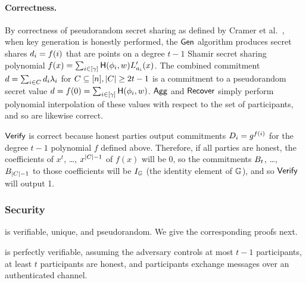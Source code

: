 \paragraph{Correctness.}
By correctness of pseudorandom secret sharing as defined by Cramer et al.~\cite{CramerDI05},
when key generation is honestly performed,
the $\mathsf{Gen}$ algorithm produces secret shares $d_i = f(i)$
that are points on a degree $t-1$ Shamir secret sharing polynomial $f(x) = \sum_{i \in [\gamma]} \mathsf{H}(\phi_i,w) L'_{a_i}(x)$.
The combined commitment $d = \sum_{i \in C}
d_i \lambda_i$ for $C \subseteq [n], \lvert C
\rvert \geq 2t-1$ is a commitment to a pseudorandom secret value
$d = f(0) = \sum_{i \in [\gamma]} \mathsf{H}(\phi_i,w)$.
$\mathsf{Agg}$ and $\mathsf{Recover}$ simply perform polynomial interpolation of these values with respect to the set of participants,
and so are likewise correct.

$\mathsf{Verify}$ is correct because honest parties output commitments $D_i  = g^{f(i)}$ for the degree $t-1$ polynomial $f$ defined above.
Therefore, if all parties are honest, the coefficients of $x^t$, \dots, $x^{\lvert C\rvert-1}$ of $f(x)$ will be 0, so the commitments $B_t$, \dots, $B_{\lvert C\rvert-1}$ to those coefficients will be $I_{\mathbb{G}}$
(the identity element of $\mathbb{G}$), and so $\mathsf{Verify}$ will output 1.

\subsubsection{Security}
\label{shine-security-thm}

\DVRFOne is verifiable, unique, and pseudorandom.
We give the corresponding proofs next.

\begin{theorem} \label{thm:dcvrf-verifiable}
\DVRFOne is perfectly verifiable,
assuming the adversary controls at most $t-1$ participants,
at least $t$ participants are honest, and
participants exchange messages over an authenticated channel.
\end{theorem}


